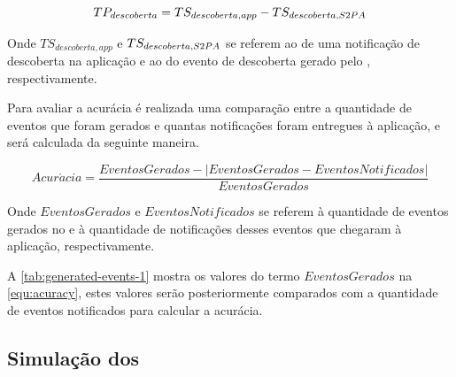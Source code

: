 \begin{equation}
	\label{equ:performance-discovery}
	TP_{descoberta} = TS_{descoberta,app} - TS_{descoberta,S2PA{}}
\end{equation}

Onde $TS_{descoberta,app}$ e $TS_{descoberta,S2PA{}}$ se referem ao \timestamp{} de uma notificação de descoberta na aplicação e ao \timestamp{} do evento de descoberta gerado pelo \stwopa{}, respectivamente.

Para avaliar a acurácia é realizada uma comparação entre a quantidade de eventos que foram gerados e quantas notificações foram entregues à aplicação, e será calculada da seguinte maneira.

\begin{equation}
	\label{equ:acuracy}
	Acur\acute{a}cia = \frac{EventosGerados - |EventosGerados - EventosNotificados|}{EventosGerados}
\end{equation}

Onde $EventosGerados$ e $EventosNotificados$ se referem à quantidade de eventos gerados no \stwopa{} e à quantidade de notificações desses eventos que chegaram à aplicação, respectivamente.

A \autoref{tab:generated-events-1} mostra os valores do termo $EventosGerados$ na \autoref{equ:acuracy}, estes valores serão posteriormente comparados com a quantidade de eventos notificados para calcular a acurácia.

\begin{table}[htb]
	\begin{center}
	\end{center}
\end{table}

\subsection{Simulação dos \beacons{}}\label{chap:avaliacao-simulacao-beacons}

